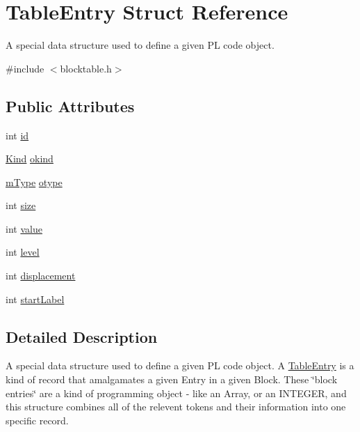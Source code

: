 \hypertarget{structTableEntry}{
\section{TableEntry Struct Reference}
\label{structTableEntry}
}


A special data structure used to define a given PL code object.  




{\ttfamily \#include $<$blocktable.h$>$}

\subsection*{Public Attributes}
\begin{DoxyCompactItemize}
\item 
int \hyperlink{structTableEntry_aded1f22bfcb60027c8adac8d927deb43}{id}
\item 
\hyperlink{blocktable_8h_aa10c9e8951b8ccf714a59ec321bdac5b}{Kind} \hyperlink{structTableEntry_a74160c41838c43ac2869239d33bea3e0}{okind}
\item 
\hyperlink{blocktable_8h_a636cfca014f3212ea82d45e28f9cb51b}{mType} \hyperlink{structTableEntry_a14059d82997cf47de6b8a8187cfd154f}{otype}
\item 
int \hyperlink{structTableEntry_a1ca46ef970e0c34c9d4f6dbfd9424e9f}{size}
\item 
int \hyperlink{structTableEntry_ab094106a732ea8edf1c8357489e69b94}{value}
\item 
int \hyperlink{structTableEntry_a4b9ee2cf034f9074da07205bc4ed8fc6}{level}
\item 
int \hyperlink{structTableEntry_ac0ba3c406ece114defb6575a8412e489}{displacement}
\item 
int \hyperlink{structTableEntry_ac5d597df796d333a3891bf967f64b5e7}{startLabel}
\end{DoxyCompactItemize}


\subsection{Detailed Description}
A special data structure used to define a given PL code object. A \hyperlink{structTableEntry}{TableEntry} is a kind of record that amalgamates a given Entry in a given Block. These \char`\"{}block entries\char`\"{} are a kind of programming object -\/ like an Array, or an INTEGER, and this structure combines all of the relevent tokens and their information into one specific record.

